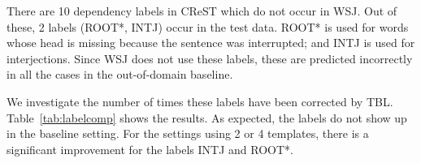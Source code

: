 
There are 10 dependency labels in CReST which do not occur in WSJ. Out of these, 2 labels  (ROOT\textsc{*}, INTJ) occur in the test data. ROOT\textsc{*} is used for words whose head is missing because the sentence was interrupted; and INTJ is used for interjections. Since WSJ does not use these labels, these are predicted incorrectly in all the cases in the out-of-domain baseline. 

We investigate the number of times these labels have been corrected by TBL. Table~\ref{tab:labelcomp} shows the results. As expected, the labels do not show up in the baseline setting. For the settings using 2 or 4 templates, there is a significant improvement for the labels INTJ and ROOT\textsc{*}. 


